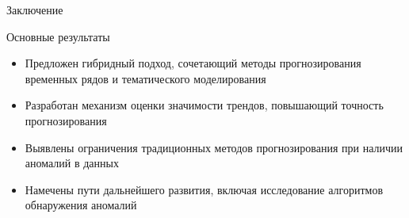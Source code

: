 \documentclass{beamer}
\begin{document}
\begin{frame}{Заключение}
\begin{block}{Основные результаты}
\begin{itemize}
    \item Предложен гибридный подход, сочетающий методы прогнозирования временных рядов и тематического моделирования
    \item Разработан механизм оценки значимости трендов, повышающий точность прогнозирования
    \item Выявлены ограничения традиционных методов прогнозирования при наличии аномалий в данных
    \item Намечены пути дальнейшего развития, включая исследование алгоритмов обнаружения аномалий
\end{itemize}
\end{block}
\end{frame}
\end{document}
